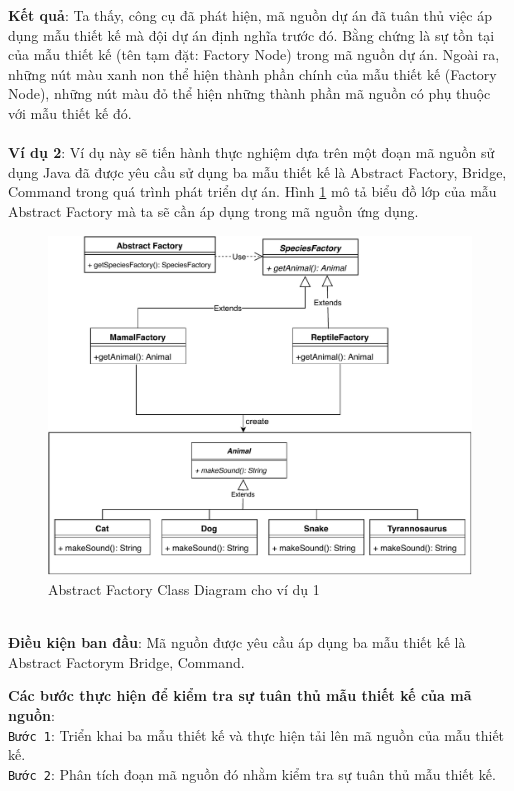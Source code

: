 \documentclass[12pt]{report}
\begin{document}
\textbf{Kết quả}: Ta thấy, công cụ đã phát hiện, mã nguồn dự án đã tuân thủ việc áp dụng mẫu thiết kế mà đội dự án định nghĩa trước đó. Bằng chứng là sự tồn tại của mẫu thiết kế (tên tạm đặt: Factory Node) trong mã nguồn dự án. Ngoài ra, những nút màu xanh non thể hiện thành phần chính của mẫu thiết kế (Factory Node), những nút màu đỏ thể hiện những thành phần mã nguồn có phụ thuộc với mẫu thiết kế đó.\\\\
\noindent \textbf{Ví dụ 2}: Ví dụ này sẽ tiến hành thực nghiệm dựa trên một đoạn mã nguồn sử dụng Java đã được yêu cầu sử dụng ba mẫu thiết kế là Abstract Factory, Bridge, Command trong quá trình phát triển dự án. Hình \ref{fig:abstract_factory_diagram} mô tả biểu đồ lớp của mẫu Abstract Factory mà ta sẽ cần áp dụng trong mã nguồn ứng dụng.
\begin{figure}[h]
	\vspace{1cm}
	\centering
	\includegraphics[scale=0.8]{images/_abstract_factory.pdf}
	\caption{Abstract Factory Class Diagram cho ví dụ 1}
	\label{fig:abstract_factory_diagram}
\end{figure}\\
\noindent \textbf{Điều kiện ban đầu}: Mã nguồn được yêu cầu áp dụng ba mẫu thiết kế là Abstract Factorym Bridge, Command.

\noindent \textbf{Các bước thực hiện để kiểm tra sự tuân thủ mẫu thiết kế của mã nguồn}:\\
\texttt{Bước 1}: Triển khai ba mẫu thiết kế và thực hiện tải lên mã nguồn của mẫu thiết kế.\\
\texttt{Bước 2}: Phân tích đoạn mã nguồn đó nhằm kiểm tra sự tuân thủ mẫu thiết kế.
\end{document}
